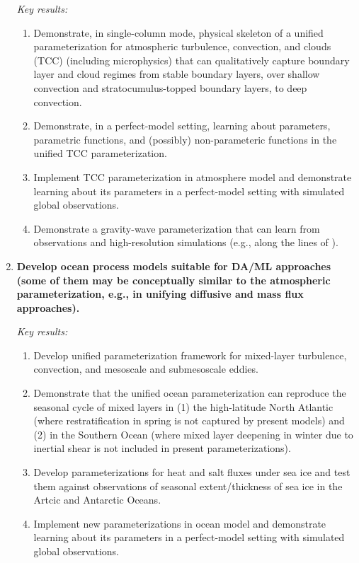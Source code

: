 \documentclass{article}
\begin{document}
\begin{enumerate}
    \emph{Key results:}
    \begin{enumerate}
        \item Demonstrate, in single-column mode, physical skeleton of a unified parameterization for atmospheric turbulence, convection, and clouds (TCC) (including microphysics) that can qualitatively capture boundary layer and cloud regimes from stable boundary layers, over shallow convection and stratocumulus-topped boundary layers, to deep convection.
        \item Demonstrate, in a perfect-model setting, learning about parameters, parametric functions, and (possibly) non-parameteric functions in the unified TCC parameterization.
        \item Implement TCC parameterization in atmosphere model and demonstrate learning about its parameters in a perfect-model setting with simulated global observations.
        \item Demonstrate a gravity-wave parameterization that can learn from observations and high-resolution simulations (e.g., along the lines of \citet{Garner18a, Zhao18a}).
    \end{enumerate}
    
     \item \textbf{Develop ocean process models suitable for DA/ML approaches (some of them may be conceptually similar to the atmospheric parameterization, e.g., in unifying diffusive and mass flux approaches).}
    
    \emph{Key results:}
    \begin{enumerate}
        \item Develop unified parameterization framework for mixed-layer turbulence, convection, and mesoscale and submesoscale eddies.
        \item Demonstrate that the unified ocean parameterization can reproduce the seasonal cycle of mixed layers in (1) the high-latitude North Atlantic (where restratification in spring is not captured by present models) and (2) in the Southern Ocean (where mixed layer deepening in winter due to inertial shear is not included in present parameterizations).
        \item Develop parameterizations for heat and salt fluxes under sea ice and test them against observations of seasonal extent/thickness of sea ice in the Artcic and Antarctic Oceans.
        \item Implement new parameterizations in ocean model and demonstrate learning about its parameters in a perfect-model setting with simulated global observations.
    \end{enumerate}
    

\end{enumerate}
\end{document}
